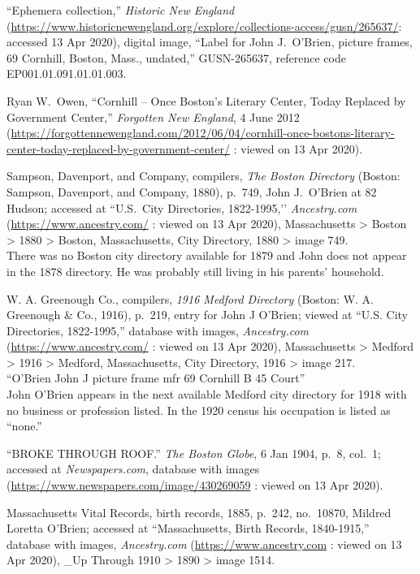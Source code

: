 \begin{thebibliography}{99}
	``Ephemera collection,'' \textit{Historic New England} (\url{https://www.historicnewengland.org/explore/collections-access/gusn/265637/}: accessed 13 Apr 2020), digital image, ``Label for John J.\ O'Brien, picture frames, 69 Cornhill, Boston, Mass., undated,'' GUSN-265637, reference code EP001.01.091.01.01.003.
	
	Ryan W.\ Owen, ``Cornhill -- Once Boston’s Literary Center, Today Replaced by Government Center,'' \textit{Forgotten New England}, 4 June 2012 (\url{https://forgottennewengland.com/2012/06/04/cornhill-once-bostons-literary-center-today-replaced-by-government-center/} : viewed on 13 Apr 2020).
	
	Sampson, Davenport, and Company, compilers, \textit{The Boston Directory} (Boston: Sampson, Davenport, and Company, 1880), p.\ 749, John J.\ O'Brien at 82 Hudson; accessed at ``U.S.\ City Directories, 1822-1995,’’ \textit{Ancestry.com} (\url{https://www.ancestry.com/} : viewed on 13 Apr 2020), Massachusetts > Boston > 1880 > Boston, Massachusetts, City Directory, 1880 > image 749.\\
	There was no Boston city directory available for 1879 and John does not appear in the 1878 directory. He was probably still living in his parents' household.
	
	W. A. Greenough Co., compilers, \textit{1916 Medford Directory} (Boston: W. A. Greenough \& Co., 1916), p.\ 219, entry for John J O'Brien; viewed at ``U.S. City Directories, 1822-1995,'' database with images, \textit{Ancestry.com} (\url{https://www.ancestry.com/} : viewed on 13 Apr 2020), Massachusetts > Medford > 1916 > Medford, Massachusetts, City Directory, 1916 > image 217.\\
	``O'Brien John J picture frame mfr 69 Cornhill B 45 Court''\\
	John O'Brien appears in the next available Medford city directory for 1918 with no business or profession listed. In the 1920 census his occupation is listed as ``none.''
	
	``BROKE THROUGH ROOF.'' \textit{The Boston Globe}, 6 Jan 1904, p.\ 8, col.\ 1; accessed at \textit{Newspapers.com}, database with images (\url{https://www.newspapers.com/image/430269059} : viewed on 13 Apr 2020).
	
	Massachusetts Vital Records, birth records, 1885, p.\ 242, no.\ 10870, Mildred Loretta O'Brien; accessed at ``Massachusetts, Birth Records, 1840-1915,'' database with images, \textit{Ancestry.com} (\url{https://www.ancestry.com} : viewed on 13 Apr 2020), \_Up Through 1910 > 1890 > image 1514.
	

\end{thebibliography}
